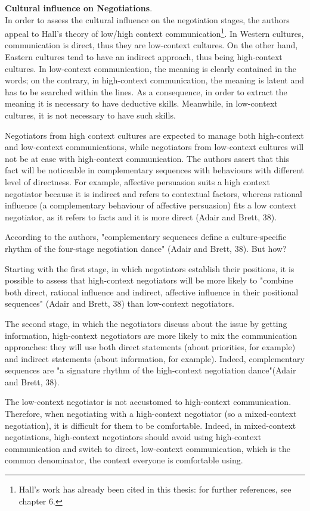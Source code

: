 \documentclass[../main.tex]{subfiles}
\begin{document}
\textbf{Cultural influence on Negotiations}.\\
In order to assess the cultural influence on the negotiation stages, the authors appeal to Hall's theory of low/high context communication\footnote{Hall's work has already been cited in this thesis: for further references, see chapter 6.}.
In Western cultures, communication is direct, thus they are low-context cultures. On the other hand, Eastern cultures tend to have an indirect approach, thus being high-context cultures. In low-context communication, the meaning is clearly contained in the words; on the contrary, in high-context communication, the meaning is latent and has to be searched within the lines. As a consequence, in order to extract the meaning it is necessary to have deductive skills. Meanwhile, in low-context cultures, it is not necessary to have such skills.

Negotiators from high context cultures are expected to manage both high-context and low-context communications, while negotiators from low-context cultures will not be at ease with high-context communication. The authors assert that this fact will be noticeable in complementary sequences with behaviours with different level of directness. For example, affective persuasion suits a high context negotiator because it is indirect and refers to contextual factors, whereas rational influence (a complementary behaviour of affective persuasion) fits a low context negotiator, as it refers to facts and it is more direct (Adair and Brett, 38).

According to the authors, "complementary sequences define a culture-specific rhythm of the four-stage negotiation dance" (Adair and Brett, 38). But how?

Starting with the first stage, in which negotiators establish their positions, it is possible to assess that high-context negotiators will be more likely to "combine both direct, rational influence and indirect, affective influence in their positional sequences" (Adair and Brett, 38) than low-context negotiators.

The second stage, in which the negotiators discuss about the issue by getting information, high-context negotiators are more likely to mix the communication approaches: they will use both direct statements (about priorities, for example) and indirect statements (about information, for example). Indeed, complementary sequences are "a signature rhythm of the high-context negotiation dance"(Adair and Brett, 38).

The low-context negotiator is not accustomed to high-context communication. Therefore, when negotiating with a high-context negotiator (so a mixed-context negotiation), it is difficult for them to be comfortable. Indeed, in mixed-context negotiations, high-context negotiators should avoid using high-context communication and switch to direct, low-context communication, which is the common denominator, the context everyone is comfortable using.
\end{document}
